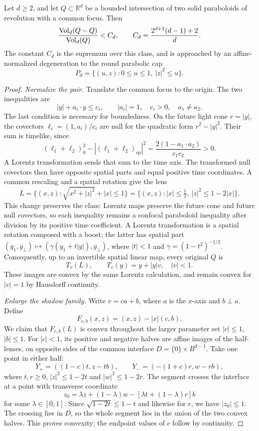 \begin{theorem}
\label{thm:two-paraboloids}
Let $d\geq2$, and let $Q\subset\mathbb R^d$ be a bounded intersection
of two solid paraboloids of revolution with a common focus. Then
\[
 \frac{\operatorname{Vol}_d(Q-Q)}{\operatorname{Vol}_d(Q)}<C_d,
 \qquad C_d=\frac{2^{d+1}(d-1)+2}{d}.
\]
The constant $C_d$ is the supremum over this class, and is approached by
an affine-normalized degeneration to the round parabolic cap
\[
 P_d=\{(u,z):0\leq u\leq1,\ |z|^2\leq u\}.
\]
\end{theorem}
\begin{proof}
\emph{Normalize the pair.}
Translate the common focus to the origin. The two inequalities are
\[
 |y|+a_i\cdot y\leq c_i,\qquad |a_i|=1,\quad c_i>0,
 \quad a_1\ne a_2.
\]
The last condition is necessary for boundedness. On the future light cone
$r=|y|$, the covectors $\ell_i=(1,a_i)/c_i$ are null for the quadratic
form $r^2-|y|^2$. Their sum is timelike, since
\[
 (\ell_1+\ell_2)_0^2-| (\ell_1+\ell_2)_{\mathrm{sp}}|^2
 =\frac{2(1-a_1\cdot a_2)}{c_1c_2}>0.
\]
A Lorentz transformation sends that sum to the time axis. The transformed
null covectors then have opposite spatial parts and equal positive time
coordinates. A common rescaling and a spatial rotation give the lens
\[
 L=\{(x,z):\sqrt{x^2+|z|^2}+|x|\leq1\}
   =\{(x,z):|x|\leq\tfrac12,\ |z|^2\leq1-2|x|\}.
\]
This change preserves the class: Lorentz maps preserve the future cone
and future null covectors, so each inequality remains a confocal
paraboloid inequality after division by its positive time coefficient.
A Lorentz transformation is a spatial rotation composed with a boost;
the latter has spatial part
$(y_1,y_\perp)\mapsto(\gamma(y_1+t|y|),y_\perp)$,
where $|t|<1$ and $\gamma=(1-t^2)^{-1/2}$.
Consequently, up to an invertible spatial linear map, every original
$Q$ is
\[
 T_v(L),\qquad T_v(y)=y+|y|v,\quad |v|<1.
\]
These images are convex by the same Lorentz calculation, and remain
convex for $|v|=1$ by Hausdorff continuity.

\emph{Enlarge the shadow family.}
Write $v=ca+b$, where $a$ is the $x$-axis and $b\perp a$. Define
\[
 F_{c,b}(x,z)=(x,z)-|x|(c,b).
\]
We claim that $F_{c,b}(L)$ is convex throughout the larger parameter set
$|c|\leq1$, $|b|\leq1$. For $|c|<1$, its positive and negative halves
are affine images of the half-lenses, on opposite sides of the common
interface $D=\{0\}\times B^{d-1}$. Take one point in either half:
\[
 Y_+=((1-c)t,z-tb),\qquad
 Y_-=(-(1+c)r,w-rb),
\]
where $t,r\geq0$, $|z|^2\leq1-2t$ and $|w|^2\leq1-2r$.
The segment crosses the interface at a point with transverse coordinate
\[
 z_0=\lambda z+(1-\lambda)w-[\lambda t+(1-\lambda)r]b
\]
for some $\lambda\in[0,1]$. Since
$\sqrt{1-2t}\leq1-t$ and likewise for $r$, we have $|z_0|\leq1$.
The crossing lies in $D$, so the whole segment lies in the union of the
two convex halves. This proves convexity; the endpoint values of $c$
follow by continuity.


\end{proof}
